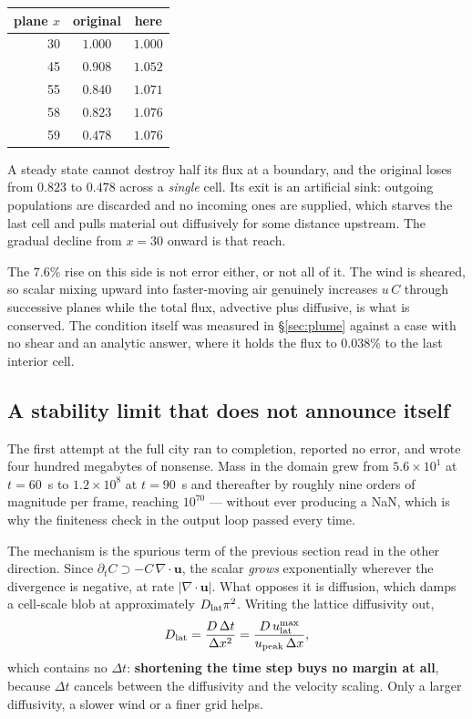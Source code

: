 \documentclass[11pt,a4paper]{article}
\newcommand{\uu}{\bm{u}}
\begin{document}
\begin{center}
\begin{tabular}{rcc}
\toprule
plane $x$ & original & here \\
\midrule
30 & $1.000$ & $1.000$ \\
45 & $0.908$ & $1.052$ \\
55 & $0.840$ & $1.071$ \\
58 & $0.823$ & $1.076$ \\
59 & $0.478$ & $1.076$ \\
\bottomrule
\end{tabular}
\end{center}

\noindent A steady state cannot destroy half its flux at a boundary, and the
original loses from $0.823$ to $0.478$ across a \emph{single} cell. Its exit is
an artificial sink: outgoing populations are discarded and no incoming ones are
supplied, which starves the last cell and pulls material out diffusively for
some distance upstream. The gradual decline from $x=30$ onward is that reach.

The $7.6\%$ rise on this side is not error either, or not all of it. The wind is
sheared, so scalar mixing upward into faster-moving air genuinely increases
$u\,C$ through successive planes while the total flux, advective plus diffusive,
is what is conserved. The condition itself was measured in \S\ref{sec:plume}
against a case with no shear and an analytic answer, where it holds the flux to
$0.038\%$ to the last interior cell.

\subsection{A stability limit that does not announce itself}
\label{sec:urbanstab}

The first attempt at the full city ran to completion, reported no error, and
wrote four hundred megabytes of nonsense. Mass in the domain grew from
$5.6\times10^{1}$ at $t=60$~s to $1.2\times10^{8}$ at $t=90$~s and thereafter by
roughly nine orders of magnitude per frame, reaching $10^{70}$ --- without ever
producing a NaN, which is why the finiteness check in the output loop passed
every time.

The mechanism is the spurious term of the previous section read in the other
direction. Since
$\partial_t C \supset -C\,\nabla\!\cdot\!\uu$, the scalar \emph{grows}
exponentially wherever the divergence is negative, at rate
$|\nabla\!\cdot\!\uu|$. What opposes it is diffusion, which damps a
cell-scale blob at approximately $D_{\rm lat}\pi^2$. Writing the lattice
diffusivity out,
\begin{equation}
  D_{\rm lat} = \frac{D\,\Delta t}{\Delta x^2}
              = \frac{D\,u_{\rm lat}^{\max}}{u_{\rm peak}\,\Delta x},
  \label{eq:dlat}
\end{equation}
which contains no $\Delta t$: \textbf{shortening the time step buys no margin
at all}, because $\Delta t$ cancels between the diffusivity and the velocity
scaling. Only a larger diffusivity, a slower wind or a finer grid helps.
\end{document}
